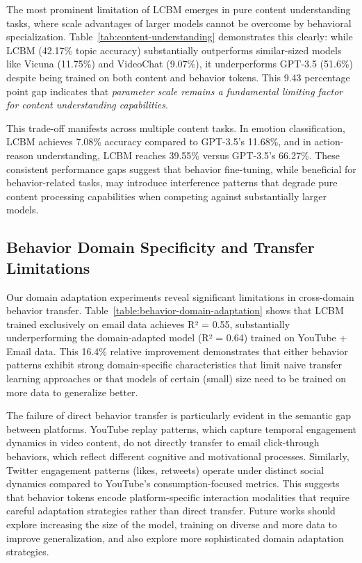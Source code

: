 The most prominent limitation of LCBM emerges in pure content understanding tasks, where scale advantages of larger models cannot be overcome by behavioral specialization. Table~\ref{tab:content-understanding} demonstrates this clearly: while LCBM (42.17\% topic accuracy) substantially outperforms similar-sized models like Vicuna (11.75\%) and VideoChat (9.07\%), it underperforms GPT-3.5 (51.6\%) despite being trained on both content and behavior tokens. This 9.43 percentage point gap indicates that \textit{parameter scale remains a fundamental limiting factor for content understanding capabilities}.

This trade-off manifests across multiple content tasks. In emotion classification, LCBM achieves 7.08\% accuracy compared to GPT-3.5's 11.68\%, and in action-reason understanding, LCBM reaches 39.55\% versus GPT-3.5's 66.27\%. These consistent performance gaps suggest that behavior fine-tuning, while beneficial for behavior-related tasks, may introduce interference patterns that degrade pure content processing capabilities when competing against substantially larger models.

\subsection{Behavior Domain Specificity and Transfer Limitations}

Our domain adaptation experiments reveal significant limitations in cross-domain behavior transfer. Table~\ref{table:behavior-domain-adaptation} shows that LCBM trained exclusively on email data achieves R² = 0.55, substantially underperforming the domain-adapted model (R² = 0.64) trained on YouTube + Email data. This 16.4\% relative improvement demonstrates that either behavior patterns exhibit strong domain-specific characteristics that limit naive transfer learning approaches or that models of certain (small) size need to be trained on more data to generalize better.

The failure of direct behavior transfer is particularly evident in the semantic gap between platforms. YouTube replay patterns, which capture temporal engagement dynamics in video content, do not directly transfer to email click-through behaviors, which reflect different cognitive and motivational processes. Similarly, Twitter engagement patterns (likes, retweets) operate under distinct social dynamics compared to YouTube's consumption-focused metrics. This suggests that behavior tokens encode platform-specific interaction modalities that require careful adaptation strategies rather than direct transfer. Future works should explore increasing the size of the model, training on diverse and more data to improve generalization, and also explore more sophisticated domain adaptation strategies.


